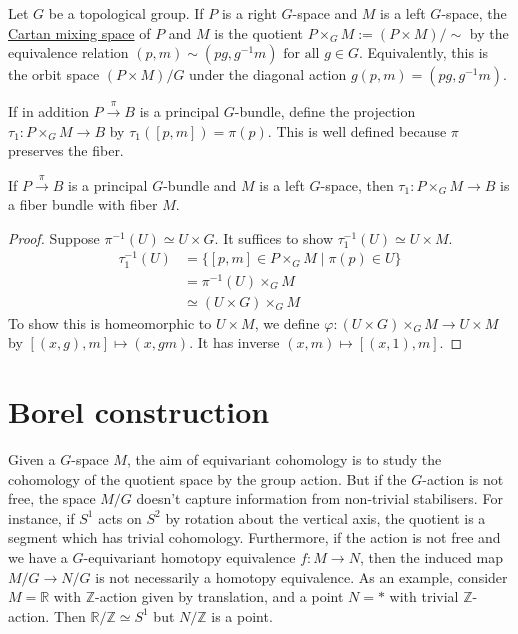 Let $G$ be a topological group.
If  $P$ is a right  $G$-space and  $M$ is a left  $G$-space, the 
\underline{Cartan mixing space} of  $P$ and  $M$ is the quotient 
$P\times_G M:= (P\times M) / \sim$ by the 
equivalence relation $(p,m)\sim (pg,g^{-1}m) \textrm{ for all }g\in G$.
Equivalently, this is the orbit space $(P\times M) /G$ under the diagonal action
$g(p,m) = (pg,g^{-1}m)$.

If in addition $P\xrightarrow{\pi} B$ is a principal $G$-bundle, define the projection
$\tau_1:P\times_GM\to B$ by $\tau_1([p,m])=\pi(p)$. This is well defined because
$\pi$ preserves the fiber.

\begin{prop} \label{prop:cartan_mixing}%
	If $P\xrightarrow{\pi} B$ is a principal  $G$-bundle and  $M$ is a left  $G$-space,
	then  $\tau_1 : P\times_G M\to B$ is a fiber bundle with fiber  $M$.
\end{prop}
\begin{proof}
	Suppose $\pi^{-1}(U)\simeq U\times G$. It suffices to show
	$\tau_1^{-1}(U)\simeq U\times M$. 
	\begin{align*}
		\tau_1^{-1}(U)
		&= \{[p,m]\in P\times_GM \mid \pi(p)\in U\} \\
		&= \pi^{-1}(U)\times _G M \\
		&\simeq (U\times G) \times_G M 
	\end{align*}
	To show this is homeomorphic to $U\times M$, we define 
	$\varphi:(U\times G) \times_G M \to U\times M$ by 
	$[(x,g),m] \mapsto (x,gm)$. It has inverse $(x,m)\mapsto [(x,1),m]$.
\end{proof}

\section{Borel construction}
Given a $G$-space  $M$, the  aim of equivariant cohomology is to study the
cohomology of the quotient space by the group action. But if the $G$-action is not free,
the space $M/G$ doesn't capture information from non-trivial stabilisers. For
instance, if  $S^1$ acts on $S^2$ by rotation about the vertical axis, the
quotient is a segment which has trivial cohomology. Furthermore, if the action is not
free and we have a $G$-equivariant homotopy equivalence  $f:M\to N$, then  
the induced map $M /G \to N /G$ is not necessarily a homotopy
equivalence. As an example, consider $M=\mathbb{R}$ with $\mathbb{Z}$-action
given by translation, and a point $N=*$ with trivial $\mathbb{Z}$-action. Then
$\mathbb{R} /\mathbb{Z} \simeq S^1$ but $N / \mathbb{Z}$ is a point.

